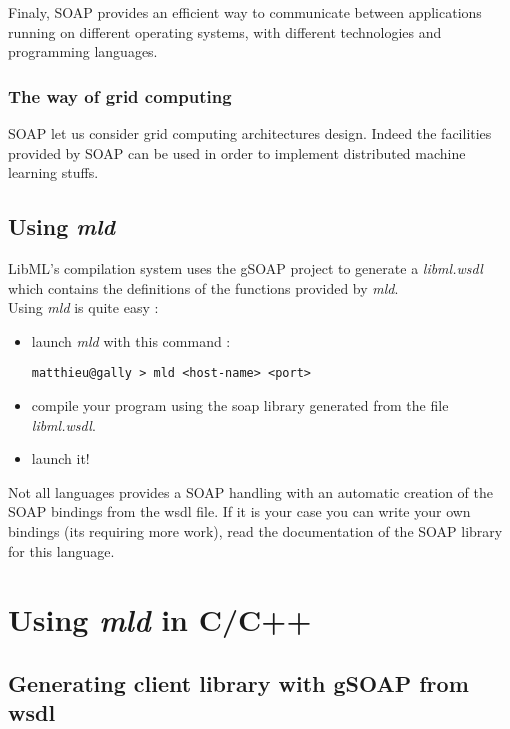 Finaly, SOAP provides an efficient way to communicate between applications running on different operating
systems, with different technologies and programming languages.

\subsubsection{The way of grid computing}

SOAP let us consider grid computing architectures design. Indeed the facilities provided by 
SOAP can be used in order to implement distributed machine learning stuffs.

\subsection{Using \emph{mld}}

LibML's compilation system uses the gSOAP project to generate
a \textit{libml.wsdl} which contains the definitions of the functions provided by \emph{mld}.\\

\noindent Using \emph{mld} is quite easy :
\begin{itemize}
\item launch \emph{mld} with this command :\\
\begin{verbatim}
matthieu@gally > mld <host-name> <port>
\end{verbatim}
\item compile your program using the soap library generated from the file
\emph{libml.wsdl}.
\item launch it!
\end{itemize}

Not all languages provides a SOAP handling with an automatic creation of the SOAP bindings 
from the wsdl file. If it is your case you can write your own bindings (its requiring more work), 
read the documentation of the SOAP library for this language.


\newpage
\section{Using \textit{mld} in C/C++}

\subsection{Generating client library with gSOAP from wsdl}

